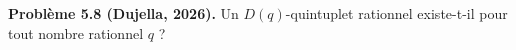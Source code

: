 \textbf{Problème 5.8 (Dujella, 2026).} Un $D(q)$-quintuplet rationnel existe-t-il pour tout nombre rationnel $q$ ?
